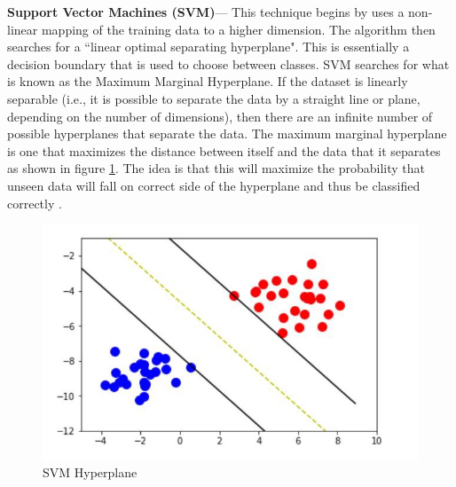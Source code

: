 \documentclass[letterpaper, 10 pt, conference]{ieeeconf}  %
\begin{document}
\textbf{Support Vector Machines (SVM)}--- This technique begins by uses a non-linear mapping of the training data to a higher dimension. The algorithm then searches for a ``linear optimal separating hyperplane". This is essentially a decision boundary that is used to choose between classes. SVM searches for what is known as the Maximum Marginal Hyperplane. If the dataset is linearly separable (i.e., it is possible to separate the data by a straight line or plane, depending on the number of dimensions), then there are an infinite number of possible hyperplanes that separate the data. The maximum marginal hyperplane is one that maximizes the distance between itself and the data that it separates as shown in figure \ref{fig:SVM_Hyperplane}. The idea is that this will maximize the probability that unseen data will fall on correct side of the hyperplane and thus be classified correctly \cite{han2011data}.  

\begin{figure}
    \centering
    \includegraphics[scale=0.4]{SVM_Hyperplane.jpeg}
    \caption{SVM Hyperplane \cite{sanjeevi_mady_2018}}
    \label{fig:SVM_Hyperplane}
\end{figure}
\end{document}
